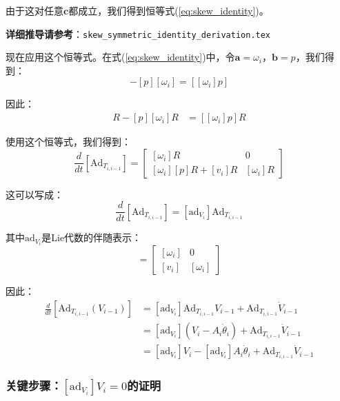 \documentclass[12pt,a4paper]{article}
\begin{document}
由于这对任意$\bm{c}$都成立，我们得到恒等式(\ref{eq:skew_identity})。

\textbf{详细推导请参考}：\texttt{skew\_symmetric\_identity\_derivation.tex}

现在应用这个恒等式。在式(\ref{eq:skew_identity})中，令$\bm{a} = \omega_i$，$\bm{b} = p$，我们得到：
\begin{equation}
[\omega_i][p] - [p][\omega_i] = [[\omega_i]p]
\end{equation}

因此：
\begin{align}
[\omega_i][p] R - [p][\omega_i] R &= [[\omega_i]p] R
\end{align}

使用这个恒等式，我们得到：
\begin{equation}
\frac{d}{dt}[\text{Ad}_{T_{i,i-1}}] = \begin{bmatrix}
[\omega_i] R & 0 \\
[\omega_i][p] R + [v_i] R & [\omega_i] R
\end{bmatrix}
\end{equation}

这可以写成：
\begin{equation}
\frac{d}{dt}[\text{Ad}_{T_{i,i-1}}] = [\text{ad}_{V_i}] \text{Ad}_{T_{i,i-1}}
\end{equation}

其中$\text{ad}_{V_i}$是Lie代数的伴随表示：
\begin{equation}
[\text{ad}_{V_i}] = \begin{bmatrix}
[\omega_i] & 0 \\
[v_i] & [\omega_i]
\end{bmatrix}
\end{equation}

因此：
\begin{align}
\frac{d}{dt}[\text{Ad}_{T_{i,i-1}}(V_{i-1})] &= [\text{ad}_{V_i}] \text{Ad}_{T_{i,i-1}} V_{i-1} + \text{Ad}_{T_{i,i-1}} \dot{V}_{i-1} \\
&= [\text{ad}_{V_i}] (V_i - A_i \dot{\theta}_i) + \text{Ad}_{T_{i,i-1}} \dot{V}_{i-1} \\
&= [\text{ad}_{V_i}] V_i - [\text{ad}_{V_i}] A_i \dot{\theta}_i + \text{Ad}_{T_{i,i-1}} \dot{V}_{i-1}
\label{eq:intermediate_step}
\end{align}

\subsubsection{关键步骤：$[\text{ad}_{V_i}] V_i = 0$的证明}
\end{document}
